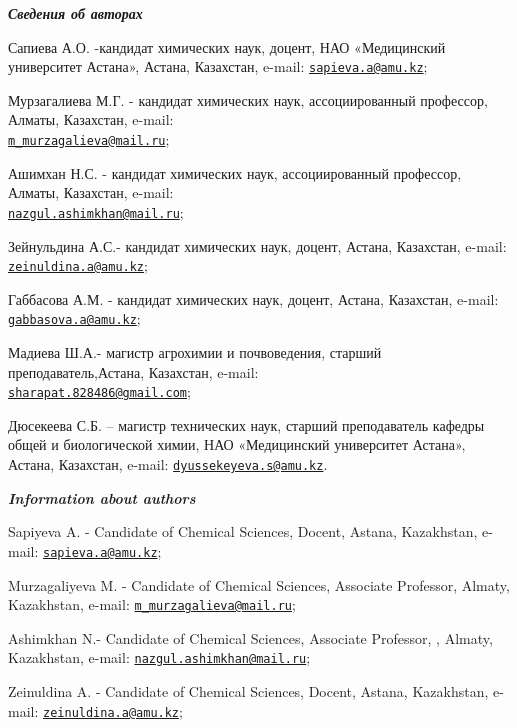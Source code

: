\begin{authorinfo}
\hspace{1em}\emph{{\bfseries Сведения об авторах}}

Сапиева А.О. -кандидат химических наук, доцент, НАО «Медицинский
университет Астана», Астана, Казахстан, e-mail:
\href{mailto:sapieva.a@amu.kz}{\nolinkurl{sapieva.a@amu.kz}};

Мурзагалиева М.Г. - кандидат химических наук, ассоциированный профессор,
Алматы, Казахстан, e-mail:
\\\href{mailto:m_murzagalieva@mail.ru}{\nolinkurl{m\_murzagalieva@mail.ru}};

Ашимхан Н.С. - кандидат химических наук, ассоциированный профессор,
Алматы, Казахстан, e-mail:
\\\href{mailto:nazgul.ashimkhan@mail.ru}{\nolinkurl{nazgul.ashimkhan@mail.ru}};

Зейнульдина А.С.- кандидат химических наук, доцент, Астана, Казахстан,
e-mail:
\href{mailto:zeinuldina.a@amu.kz}{\nolinkurl{zeinuldina.a@amu.kz}};

Габбасова А.М. - кандидат химических наук, доцент, Астана, Казахстан,
e-mail:
\href{mailto:gabbasova.a@amu.kz}{\nolinkurl{gabbasova.a@amu.kz}};

Мадиева Ш.А.- магистр агрохимии и почвоведения, старший
преподаватель,Астана, Казахстан, e-mail:\\
\href{mailto:sharapat.828486@gmail.com}{\nolinkurl{sharapat.828486@gmail.com}};

Дюсекеева С.Б. -- магистр технических наук, старший преподаватель
кафедры общей и биологической химии, НАО «Медицинский университет
Астана», Астана, Казахстан, e-mail:
\href{mailto:dyussekeyeva.s@amu.kz}{\nolinkurl{dyussekeyeva.s@amu.kz}}.

\hspace{1em}\emph{{\bfseries Information about authors}}

Sapiyeva A. - Candidate of Chemical Sciences, Docent, Astana,
Kazakhstan, e-mail:
\href{mailto:sapieva.a@amu.kz}{\nolinkurl{sapieva.a@amu.kz}};

Murzagaliyeva M. - Candidate of Chemical Sciences, Associate Professor,
Almaty, Kazakhstan, e-mail:
\href{mailto:m_murzagalieva@mail.ru}{\nolinkurl{m\_murzagalieva@mail.ru}};

Ashimkhan N.- Candidate of Chemical Sciences, Associate Professor, ,
Almaty, Kazakhstan, e-mail:
\href{mailto:nazgul.ashimkhan@mail.ru}{\nolinkurl{nazgul.ashimkhan@mail.ru}};

Zeinuldina A. - Candidate of Chemical Sciences, Docent, Astana,
Kazakhstan, e-mail:
\href{mailto:zeinuldina.a@amu.kz}{\nolinkurl{zeinuldina.a@amu.kz}};


\end{authorinfo}
